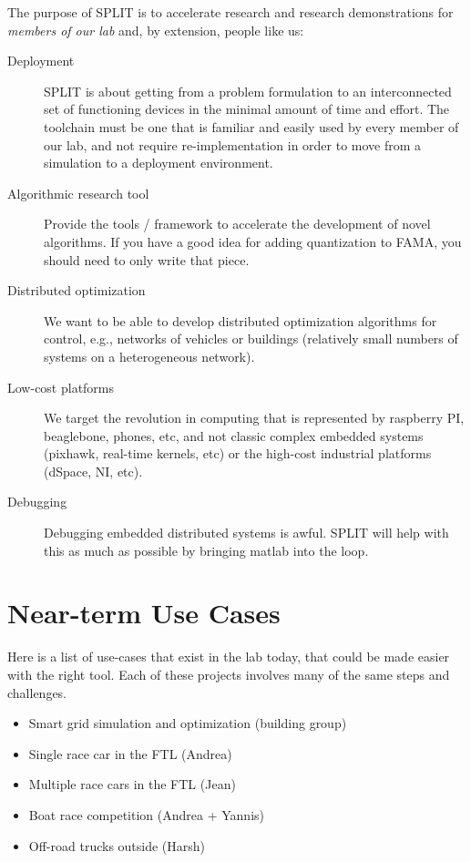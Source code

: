 \documentclass[11pt,a4paper]{article}
\begin{document}
The purpose of SPLIT is to accelerate research and research demonstrations for \emph{members of our lab} and, by extension, people like us:
\begin{description}
  \item[Deployment] SPLIT is about getting from a problem formulation to an interconnected set of functioning devices in the minimal amount of time and effort. The toolchain must be one that is familiar and easily used by every member of our lab, and not require re-implementation in order to move from a simulation to a deployment environment. %
  \item[Algorithmic research tool] Provide the tools / framework to accelerate the development of novel algorithms. If you have a good idea for adding quantization to FAMA, you should need to only write that piece.
  \item[Distributed optimization] We want to be able to develop distributed optimization algorithms for control, e.g., networks of vehicles or buildings (relatively small numbers of systems on a heterogeneous network).
  \item[Low-cost platforms] We target the revolution in computing that is represented by raspberry PI, beaglebone, phones, etc, and not classic complex embedded systems (pixhawk, real-time kernels, etc) or the high-cost industrial platforms (dSpace, NI, etc).
  \item[Debugging] Debugging embedded distributed systems is awful. SPLIT will help with this as much as possible by bringing matlab into the loop.
\end{description}

\section*{Near-term Use Cases}
Here is a list of use-cases that exist in the lab today, that could be made easier with the right tool. Each of these projects involves many of the same steps and challenges.

\begin{itemize}
  \item Smart grid simulation and optimization (building group)
  \item Single race car in the FTL (Andrea)
  \item Multiple race cars in the FTL (Jean)
  \item Boat race competition (Andrea + Yannis)
  \item Off-road trucks outside (Harsh)
\end{itemize}
\end{document}
